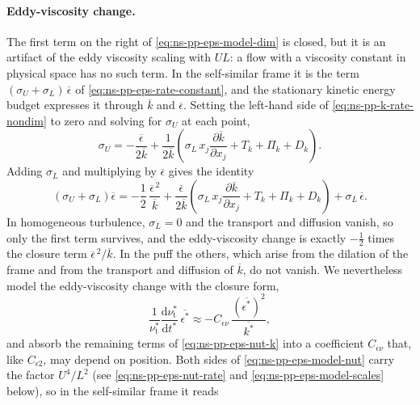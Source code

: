 \documentclass{article}
\begin{document}
\paragraph{Eddy-viscosity change.}
The first term on the right of \eqref{eq:ns-pp-eps-model-dim} is closed, but
it is an artifact of the eddy viscosity scaling with $UL$: a flow with a
viscosity constant in physical space has no such term. In the self-similar
frame it is the term $(\sigma_U + \sigma_L)\, \overline{\epsilon}$ of
\eqref{eq:ns-pp-eps-rate-constant}, and the stationary kinetic energy budget
expresses it through $\overline{k}$ and $\overline{\epsilon}$. Setting the
left-hand side of \eqref{eq:ns-pp-k-rate-nondim} to zero and solving for
$\sigma_U$ at each point,
\begin{equation*}
  \sigma_U
  = -\frac{\overline{\epsilon}}{2\overline{k}}
  + \frac{1}{2\overline{k}} \left( \sigma_L\, x_j \frac{\partial \overline{k}}{\partial x_j}
  + T_k + \Pi_k + D_k \right) .
\end{equation*}
Adding $\sigma_L$ and multiplying by $\overline{\epsilon}$ gives the identity
\begin{equation}\label{eq:ns-pp-eps-nut-k}
  \left( \sigma_U + \sigma_L \right) \overline{\epsilon}
  = -\frac12\, \frac{\overline{\epsilon}^{\,2}}{\overline{k}}
  + \frac{\overline{\epsilon}}{2\overline{k}} \left( \sigma_L\, x_j \frac{\partial \overline{k}}{\partial x_j}
  + T_k + \Pi_k + D_k \right)
  + \sigma_L\, \overline{\epsilon} .
\end{equation}
In homogeneous turbulence, $\sigma_L = 0$ and the transport and diffusion
vanish, so only the first term survives, and the eddy-viscosity change is
exactly $-\tfrac12$ times the closure term $\overline{\epsilon}^{\,2}/\overline{k}$.
In the puff the others, which arise from the dilation of the frame and from
the transport and diffusion of $\overline{k}$, do not vanish. We nevertheless
model the eddy-viscosity change with the closure form,
\begin{equation}\label{eq:ns-pp-eps-model-nut}
  \frac{1}{\nu_{\mathrm{t}}^*}\frac{\mathrm{d}\nu_{\mathrm{t}}^*}{\mathrm{d}t^*}\, \overline{\epsilon^*}
  \approx -C_{\epsilon\nu}\, \frac{\left(\overline{\epsilon^*}\right)^2}{\overline{k^*}} ,
\end{equation}
and absorb the remaining terms of \eqref{eq:ns-pp-eps-nut-k} into a
coefficient $C_{\epsilon\nu}$ that, like $C_{\epsilon 2}$, may depend on
position. Both sides of \eqref{eq:ns-pp-eps-model-nut} carry the factor
$U^4/L^2$ (see \eqref{eq:ns-pp-eps-nut-rate} and
\eqref{eq:ns-pp-eps-model-scales} below), so in the self-similar frame it reads
\end{document}
